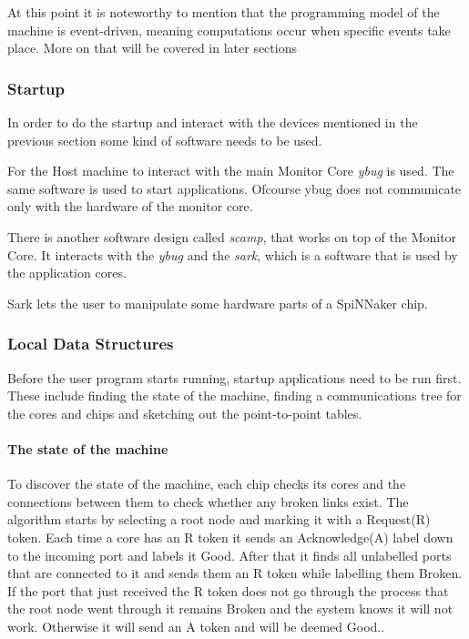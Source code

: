 \documentclass[12pt,a4paper]{article}
\begin{document}
At this point it is noteworthy to mention that the programming model of the machine is event-driven, meaning computations occur when specific events take place. More on that will be covered in later sections
\subsubsection{Startup}
In order to do the startup and interact with the devices mentioned in the previous section some kind of software needs to be used.

For the Host machine to interact with the main Monitor Core \emph{ybug} is used. The same software is used to start applications. Ofcourse ybug does not communicate only with the hardware of the monitor core. 

There is another software design called \emph{scamp}, that works on top of the Monitor Core. It interacts with the \emph{ybug} and the \emph{sark}, which is a software that is used by the application cores. 

Sark lets the user to manipulate some hardware parts of a SpiNNaker chip.\cite{spinnweb}
\subsubsection{Local Data Structures}
Before the user program starts running, startup applications need to be run first. These include finding the state of the machine, finding a communications tree for the cores and chips and sketching out the point-to-point tables.

\paragraph{The state of the machine}
To discover the state of the machine, each chip checks its cores and the connections between them to check whether any broken links exist. The algorithm starts by selecting a root node and marking it with a Request(R) token. Each time a core has an R token it sends an Acknowledge(A) label down to the incoming port and labels it Good. After that it finds all unlabelled ports that are connected to it and sends them an R token while labelling them Broken. If the port that just received the R token does not go through the process that the root node went through it remains Broken and the system knows it will not work. Otherwise it will send an A token and will be deemed Good.\cite{jefflec}.
\end{document}
